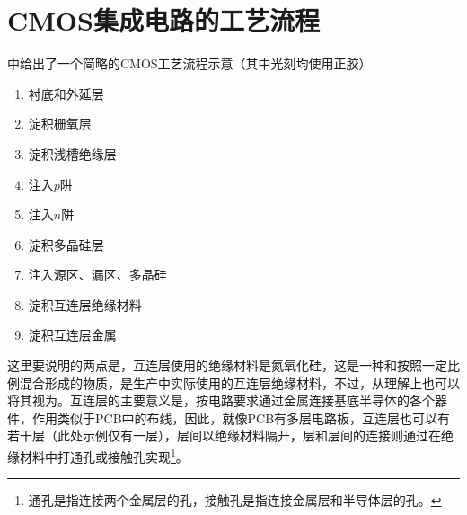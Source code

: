 \section{CMOS集成电路的工艺流程}

中给出了一个简略的CMOS工艺流程示意（其中光刻均使用正胶）
\begin{enumerate}
    \item 衬底和外延层
    \item 淀积栅氧层
    \item 淀积浅槽绝缘层
    \item 注入$p$阱
    \item 注入$n$阱
    \item 淀积多晶硅层
    \item 注入源区、漏区、多晶硅
    \item 淀积互连层绝缘材料
    \item 淀积互连层金属
\end{enumerate}


这里要说明的两点是，互连层使用的绝缘材料是氮氧化硅，这是一种和按照一定比例混合形成的物质，是生产中实际使用的互连层绝缘材料，不过，从理解上也可以将其视为。互连层的主要意义是，按电路要求通过金属连接基底半导体的各个器件，作用类似于PCB中的布线，因此，就像PCB有多层电路板，互连层也可以有若干层（此处示例仅有一层），层间以绝缘材料隔开，层和层间的连接则通过在绝缘材料中打通孔或接触孔实现\footnote{通孔是指连接两个金属层的孔，接触孔是指连接金属层和半导体层的孔。}。

\newpage

